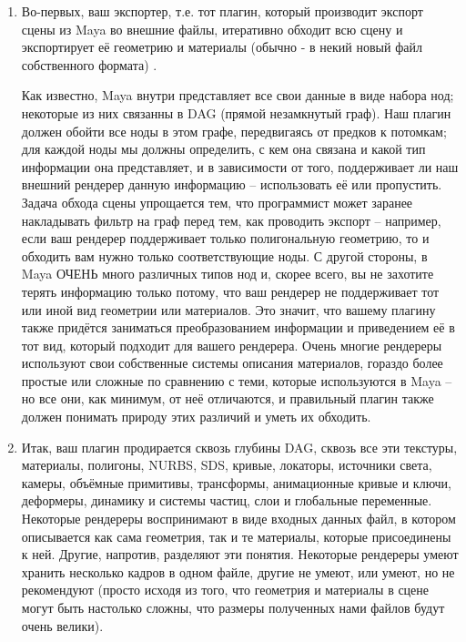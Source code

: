  	\begin{enumerate}
	\item                    Во-первых, ваш экспортер, т.е. тот
    плагин, который производит экспорт сцены из Maya во внешние
    файлы,  итеративно
    обходит всю сцену и экспортирует её геометрию и материалы (обычно -
    в некий новый файл собственного формата) .\hfil\break
    
Как известно, Maya внутри
    представляет все свои данные в виде набора нод; некоторые из них
    связанны в DAG (прямой незамкнутый граф). Наш плагин должен обойти
    все ноды в этом графе, передвигаясь от предков к потомкам; для
    каждой ноды мы должны определить, с кем она связана и какой тип
    информации она представляет, и в зависимости от того, поддерживает
    ли наш внешний рендерер данную информацию – использовать её или
    пропустить. Задача обхода сцены упрощается тем, что программист
    может заранее накладывать фильтр на граф перед тем, как проводить
    экспорт – например, если ваш рендерер поддерживает только
    полигональную геометрию, то и обходить вам нужно только
    соответствующие ноды. С другой стороны, в Maya ОЧЕНЬ много
    различных типов нод и, скорее всего, вы не захотите терять
    информацию только потому, что ваш рендерер не поддерживает тот или
    иной вид геометрии или материалов. Это значит, что вашему плагину
    также придётся заниматься преобразованием информации и приведением
    её в тот вид, который подходит для вашего рендерера. Очень многие
    рендереры используют свои собственные системы описания материалов,
    гораздо более простые или сложные по сравнению с теми, которые
    используются в Maya – но все они, как минимум, от неё отличаются, и
    правильный плагин также должен понимать природу этих различий и
    уметь их обходить.
  

\item                    Итак, ваш плагин продирается сквозь
    глубины DAG, сквозь все
    эти текстуры, материалы, полигоны, NURBS, SDS,
    кривые, локаторы, источники света, камеры, объёмные примитивы,
    трансформы, анимационные кривые и ключи, деформеры, динамику и
    системы частиц, слои и глобальные переменные. Некоторые рендереры
    воспринимают в виде входных данных файл, в котором описывается как
    сама геометрия, так и те материалы, которые присоединены к ней.
    Другие, напротив, разделяют эти понятия. Некоторые рендереры умеют
    хранить несколько кадров в одном файле, другие не умеют, или умеют,
    но не рекомендуют (просто исходя из того, что геометрия и материалы
    в сцене могут быть настолько сложны, что размеры полученных нами
    файлов будут очень велики).
  


\end{enumerate}
